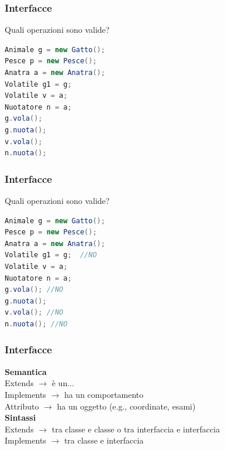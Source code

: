 \documentclass{beamer}
\begin{document}
\begin{frame}[fragile]
\frametitle{Interfacce}
Quali operazioni sono valide?
\begin{lstlisting}[language=Java,escapechar=|]
Animale g = new Gatto(); 
Pesce p = new Pesce(); 
Anatra a = new Anatra(); 
Volatile g1 = g; 
Volatile v = a;
Nuotatore n = a;
g.vola();
g.nuota();
v.vola();
n.nuota();
\end{lstlisting}
\end{frame}

\begin{frame}[fragile]
\frametitle{Interfacce}
Quali operazioni sono valide?
\begin{lstlisting}[language=Java,escapechar=|]
Animale g = new Gatto(); 
Pesce p = new Pesce(); 
Anatra a = new Anatra(); 
Volatile g1 = g;  //NO
Volatile v = a;
Nuotatore n = a;
g.vola(); //NO
g.nuota();
v.vola(); //NO
n.nuota(); //NO
\end{lstlisting}
\end{frame}


\begin{frame}[fragile]
\frametitle{Interfacce}
\textbf{Semantica}\\
Extends $\rightarrow$ \`e un...\\
Implements $\rightarrow$ ha un comportamento\\
Attributo $\rightarrow$ ha un oggetto (e.g., coordinate, esami) \\
\vspace{1cm}
\textbf{Sintassi}\\
Extends $\rightarrow$ tra classe e classe o tra interfaccia e interfaccia\\
Implements $\rightarrow$ tra classe e interfaccia\\
\end{frame}
\end{document}
